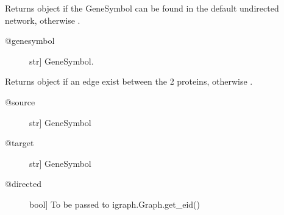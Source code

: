 \documentclass[letterpaper,10pt,english]{sphinxmanual}
\begin{document}
\begin{fulllineitems}
\begin{fulllineitems}
\begin{quote}
\begin{description}
\end{description}\end{quote}

\end{fulllineitems}


\begin{fulllineitems}
\label{\detokenize{main:pypath.main.PyPath.gs}}
Returns  object if the GeneSymbol
can be found in the default undirected network,
otherwise .
\begin{description}
\item[{@genesymbol}] \leavevmode{[}str{]}
GeneSymbol.

\end{description}

\end{fulllineitems}


\begin{fulllineitems}
\label{\detokenize{main:pypath.main.PyPath.gs_edge}}
Returns  object if an edge exist between
the 2 proteins, otherwise .
\begin{description}
\item[{@source}] \leavevmode{[}str{]}
GeneSymbol

\item[{@target}] \leavevmode{[}str{]}
GeneSymbol

\item[{@directed}] \leavevmode{[}bool{]}
To be passed to igraph.Graph.get\_eid()

\end{description}

\end{fulllineitems}


\begin{fulllineitems}
\label{\detokenize{main:pypath.main.PyPath.guide2pharma}}
\end{fulllineitems}


\end{fulllineitems}
\end{document}
